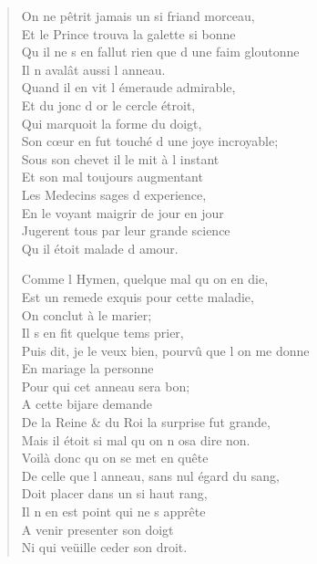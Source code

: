 \documentclass[14pt,a4paper]{memoir}
\begin{document}
{{\begin{otherlanguage}{french}
\begin{verse}
On ne pêtrit jamais un si friand morceau, \\
Et le Prince trouva la galette si bonne \\
Qu\textquotesingle{} il ne s\textquotesingle{} en fallut rien que d\textquotesingle{} une faim gloutonne \\
\vin Il n\textquotesingle{} avalât aussi l\textquotesingle{} anneau. \\
\vin Quand il en vit l\textquotesingle{} émeraude admirable, \\
\vin Et du jonc d\textquotesingle{} or le cercle étroit, \\
\vin Qui marquoit la forme du doigt, \\
Son cœur en fut touché d\textquotesingle{} une joye incroyable; \\
\vin Sous son chevet il le mit à l\textquotesingle{} instant \\
\vin Et son mal toujours augmentant \\
\vin Les Medecins sages d\textquotesingle{} experience, \\
\vin En le voyant maigrir de jour en jour \\
\vin Jugerent tous par leur grande science \\
\vin Qu\textquotesingle{} il étoit malade d\textquotesingle{} amour.

\vin Comme l\textquotesingle{} Hymen, quelque mal qu\textquotesingle{} on en die, \\
Est un remede exquis pour cette maladie, \\
\vin On conclut à le marier; \\
\vin Il s\textquotesingle{} en fit quelque tems prier, \\
Puis dit, je le veux bien, pourvû que l\textquotesingle{} on me donne \\
\vin En mariage la personne \\
\vin Pour qui cet anneau sera bon; \\
\vin A cette bijare demande \\
De la Reine \& du Roi la surprise fut grande, \\
Mais il étoit si mal qu\textquotesingle{} on n\textquotesingle{} osa dire non. \\
\vin Voilà donc qu\textquotesingle{} on se met en quête \\
De celle que l\textquotesingle{} anneau, sans nul égard du sang, \\
\vin Doit placer dans un si haut rang, \\
\vin Il n\textquotesingle{} en est point qui ne s\textquotesingle{} apprête \\
\vin A venir presenter son doigt \\
\vin Ni qui veüille ceder son droit.


\end{verse}
\end{otherlanguage}}}
\end{document}
